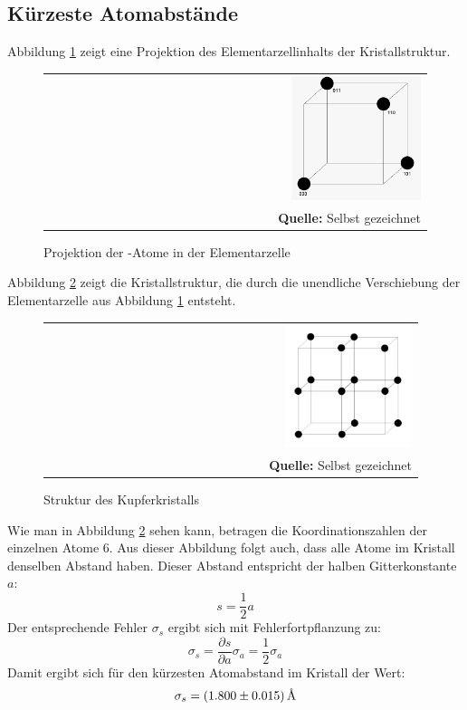 \documentclass[a4paper,titlepage]{scrartcl}
\newcommand{\angstrom}{\mbox{\normalfont\AA}}
\numberwithin{equation}{section}
\begin{document}
\subsection{Kürzeste Atomabstände}
Abbildung \ref{fig:cu-elementarzelle} zeigt eine Projektion des Elementarzellinhalts der Kristallstruktur.
\begin{figure}[H]
	\centering
	\begin{tabular}{@{}r@{}}
		\includegraphics[width=0.35\textwidth]{images/cu-elementarzelle.png}\\
		\footnotesize\sffamily\textbf{Quelle:} Selbst gezeichnet
	\end{tabular}
	\caption{Projektion der -Atome in der Elementarzelle}
    \label{fig:cu-elementarzelle}
\end{figure}
Abbildung \ref{fig:cu-kristall} zeigt die Kristallstruktur, die durch die unendliche Verschiebung der Elementarzelle aus Abbildung \ref{fig:cu-elementarzelle} entsteht.
\begin{figure}[H]
	\centering
	\begin{tabular}{@{}r@{}}
		\includegraphics[width=0.35\textwidth]{images/cu-kristall.png}\\
		\footnotesize\sffamily\textbf{Quelle:} Selbst gezeichnet
	\end{tabular}
	\caption{Struktur des Kupferkristalls}
    \label{fig:cu-kristall}
\end{figure}
Wie man in Abbildung \ref{fig:cu-kristall} sehen kann, betragen die Koordinationszahlen der einzelnen Atome 6. Aus dieser Abbildung folgt auch, dass alle Atome im Kristall denselben Abstand haben. Dieser Abstand entspricht der halben Gitterkonstante $a$:
\begin{equation*}
s=\frac{1}{2} a
\end{equation*}
Der entsprechende Fehler $\sigma_s$ ergibt sich mit Fehlerfortpflanzung zu:
\begin{equation*}
\sigma_s= \frac{\partial s}{\partial a} \sigma_a=\frac{1}{2} \sigma_a
\end{equation*}
Damit ergibt sich für den kürzesten Atomabstand im Kristall der Wert:
\begin{equation*}
\sigma_s=\unit[(1.800 \pm 0.015)]{\angstrom}
\end{equation*}
\end{document}
